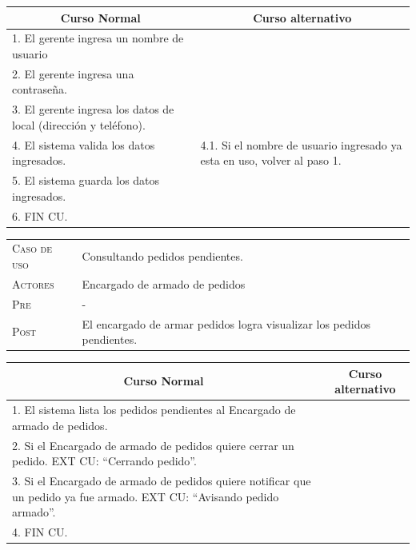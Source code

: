 \begin{center}
\begin{tabular}{|p{}|p{}|}
    \hline
    \multicolumn{1}{|c|}{Curso Normal} &
    \multicolumn{1}{|c|}{Curso alternativo} \\
    \hline
    1. El gerente ingresa un nombre de usuario &\\
    2. El gerente ingresa una contraseña. & \\
    3. El gerente ingresa los datos de local (dirección y teléfono). & \\
    4. El sistema valida los datos ingresados. & 
    4.1. Si el nombre de usuario ingresado ya esta en uso, volver al paso 1.\\
    5. El sistema guarda los datos ingresados. & \\
    6. FIN CU. & \\
    \hline
\end{tabular}
\end{center}

\begin{tabular}{p{} p{}}
    \textsc{Caso de uso} & Consultando pedidos pendientes. \\
    \textsc{Actores} & Encargado de armado de pedidos \\
    \textsc{Pre} & - \\
    \textsc{Post} & El encargado de armar pedidos logra visualizar los pedidos
    pendientes. \\
\end{tabular}

\begin{center}
\begin{tabular}{|p{}|p{}|}
    \hline
    \multicolumn{1}{|c|}{Curso Normal} &
    \multicolumn{1}{|c|}{Curso alternativo} \\
    \hline
    1. El sistema lista los pedidos pendientes al Encargado de armado de
    pedidos. & \\
    2. Si el Encargado de armado de pedidos quiere cerrar un pedido. EXT CU:
    ``Cerrando pedido''. & \\
    3. Si el Encargado de armado de pedidos quiere notificar que un pedido ya
    fue armado. EXT CU: ``Avisando pedido armado''. & \\
    4. FIN CU. & \\
    \hline
\end{tabular}
\end{center}


